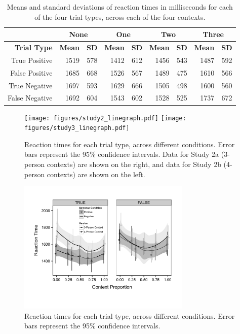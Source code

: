 \documentclass[10pt,letterpaper]{article}
\begin{document}
\begin{table}[t]
\caption{Means and standard deviations of reaction times in milliseconds for each of the four trial types, across each of the four contexts.}
\begin{center}
\small\addtolength{\tabcolsep}{-5pt}
\begin{tabular}{ r  r  r  r  r  r  r  r  r} 
\hline
& \multicolumn{2}{c}{\bf{None}} & \multicolumn{2}{c}{\bf{One}}  & \multicolumn{2}{c}{\bf{Two}}  & \multicolumn{2}{c}{\bf{Three}}\\
\hline
  \bf{Trial Type} & \bf{Mean} & \bf{SD} & \bf{Mean} & \bf{SD} & \bf{Mean} & \bf{SD} & \bf{Mean} & \bf{SD} \\ \hline                      
True Positive & 1519 & 578 & 1412 & 612 & 1456 & 543 & 1487 & 592\\
 False Positive & 1685 & 668 & 1526 & 567 & 1489 & 475 & 1610 & 566\\
 True Negative& 1697 & 593 & 1629 & 666 & 1505 & 498 & 1600 & 560\\
  False Negative & 1692 & 604 & 1543 & 602 & 1528 & 525 & 1737 & 672\\
\hline
\end{tabular}
\end{center}
\end{table}

\begin{figure}
\begin{center} 
\texttt{[image: figures/study2\_linegraph.pdf]}
\texttt{[image: figures/study3\_linegraph.pdf]}
\caption{\label{fig:addition_subs} Reaction times for each trial type, across different conditions.  Error bars represent the 95\% confidence intervals.  Data for Study 2a (3-person contexts) are shown on the right, and data for Study 2b (4-person contexts) are shown on the left.  }
\end{center} 
\end{figure}

\begin{figure}
\begin{center} 
\includegraphics[width=3.25in]{figures/combined_plot.pdf}
\caption{\label{fig:addition_subs} Reaction times for each trial type, across different conditions.  Error bars represent the 95\% confidence intervals.}
\end{center} 
\end{figure}
\end{document}
